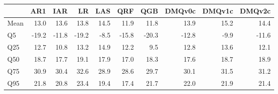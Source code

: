 \begin{tabular}{lrrrrrrrrr}
\toprule
 & AR1 & IAR & LR & LAS & QRF & QGB & DMQv0c & DMQv1c & DMQv2c \\
\midrule
Mean & 13.0 & 13.6 & 13.8 & 14.5 & 11.9 & 11.8 & 13.9 & 15.2 & 14.4 \\
Q5 & -19.2 & -11.8 & -19.2 & -8.5 & -15.8 & -20.3 & -12.8 & -9.9 & -11.6 \\
Q25 & 12.7 & 10.8 & 13.2 & 14.9 & 12.2 & 9.5 & 12.8 & 13.6 & 12.1 \\
Q50 & 18.7 & 17.7 & 19.1 & 17.9 & 17.0 & 18.3 & 17.6 & 18.7 & 18.9 \\
Q75 & 30.9 & 30.4 & 32.6 & 28.9 & 28.6 & 29.7 & 30.1 & 31.5 & 31.2 \\
Q95 & 21.8 & 20.8 & 23.4 & 19.4 & 17.4 & 21.7 & 22.0 & 21.9 & 21.4 \\
\bottomrule
\end{tabular}
